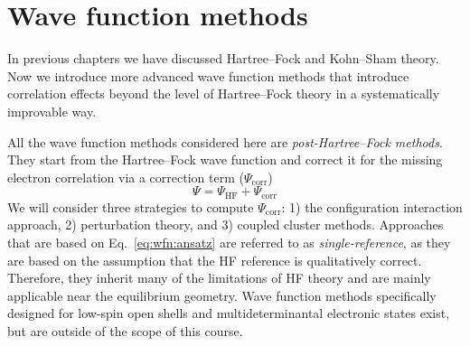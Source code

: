 \documentclass[../Main/chem371-notes.tex]{subfiles}
\begin{document}
\chapter{Wave function methods}

In previous chapters we have discussed Hartree--Fock and Kohn--Sham theory.
Now we introduce more advanced wave function methods that introduce correlation effects beyond the level of Hartree--Fock theory in a systematically improvable way.


All the wave function methods considered here are \emph{post-Hartree--Fock methods}.
They start from the Hartree--Fock wave function and correct it for the missing electron correlation via a correction term ($\Psi_\mathrm{corr}$)
\begin{equation}
\label{eq:wfn:ansatz}
\Psi = \Psi_\mathrm{HF} +  \Psi_\mathrm{corr}
\end{equation}
We will consider three strategies to compute $\Psi_\mathrm{corr}$: 1) the configuration interaction approach, 2) perturbation theory, and 3) coupled cluster methods.
Approaches that are based on Eq.~\eqref{eq:wfn:ansatz} are referred to as \emph{single-reference}, as they are based on the assumption that the HF reference is qualitatively correct.
Therefore, they inherit many of the limitations of HF theory and are mainly applicable near the equilibrium geometry.
Wave function methods specifically designed for low-spin open shells and multideterminantal electronic states exist, but are outside of the scope of this course.
\end{document}
